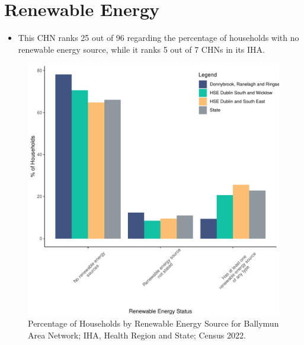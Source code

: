 \documentclass{article}
\begin{document}
\section{Renewable Energy}\label{sect:RE}
\begin{itemize}
\item This CHN ranks  25 out of 96 regarding the percentage of households with no renewable energy source, while it ranks   5 out of 7 CHNs in its IHA.
\end{itemize}
\begin{figure}[H]
	\centering
	\includegraphics[width = 140mm]{../figures/RenewableEnergyED.pdf}
	\caption{Percentage of Households by Renewable Energy Source for Ballymun Area Network; IHA, Health Region and State; Census 2022.}
	\label{fig:vbnv}
	\end{figure}
\end{document}
